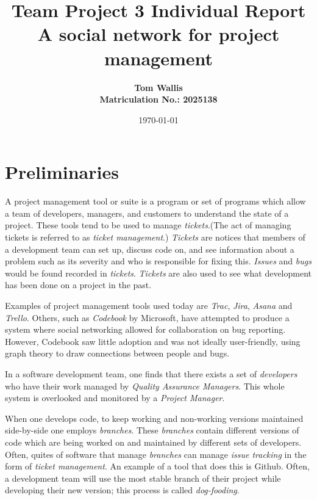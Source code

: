 \documentclass[10pt]{article}
\author{\textbf{Tom Wallis \\ \bf Matriculation No.: 2025138}}
\date{\today}
\title{Team Project 3 Individual Report\\
A social network for project management\\ \vspace{4mm}
}
\begin{document}
\maketitle

\section{Preliminaries}\par
A project management tool or suite is a program or set of programs which allow a team of developers, managers, and customers to understand the state of a project. These tools tend to be used to manage \emph{tickets}.(The act of managing tickets is referred to as \emph{ticket management}.) \emph{Tickets} are notices that members of a development team can set up, discuss code on, and see information about a problem such as its severity and who is responsible for fixing this. \emph{Issues} and \emph{bugs} would be found recorded in \emph{tickets}. \emph{Tickets} are also used to see what development has been done on a project in the past. \par
Examples of project management tools used today are \emph{Trac}, \emph{Jira}, \emph{Asana} and \emph{Trello}. Others, such as \emph{Codebook} by Microsoft, have attempted to produce a system where social networking allowed for collaboration on bug reporting. However, Codebook saw little adoption and was not ideally user-friendly, using graph theory to draw connections between people and bugs. \par
In a software development team, one finds that there exists a set of \emph{developers} who have their work managed by \emph{Quality Assurance Managers}. This whole system is overlooked and monitored by a \emph{Project Manager}. \par
When one develops code, to keep working and non-working versions maintained side-by-side one employs \emph{branches}. These \emph{branches} contain different versions of code which are being worked on and maintained by different sets of developers. Often, quites of software that manage \emph{branches} can manage \emph{issue tracking} in the form of \emph{ticket management}. An example of a tool that does this is Github. Often, a development team will use the most stable branch of their project while developing their new version; this process is called \emph{dog-fooding}.\par
\end{document}
